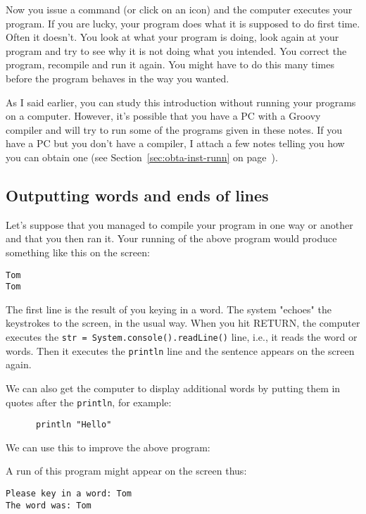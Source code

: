 Now you issue a command (or click on an icon) and the computer executes
your program.  If you are lucky, your program does what it is supposed
to do first time.  Often it doesn't.  You look at what your program is
doing, look again at your program and try to see why it is not doing what
you intended.  You correct the program, recompile and run it again.
You might have to do this many times before the program behaves in the way
you wanted.

As I said earlier, you can study this introduction without running your
programs on a computer.  However, it's possible that you have a PC with
a Groovy compiler and will try to run some of the programs given in these
notes. 
If you have a PC but you don't have a compiler, I attach a few notes telling
you how you can obtain one (see Section~\ref{sec:obta-inst-runn} on
page~\pageref{sec:obta-inst-runn}).

\subsection{Outputting words and ends of lines}

Let's suppose that you managed to compile your program in one way or
another and that you then ran it.  Your running of the above program
would produce something like this on the screen:

\begin{Verbatim}
Tom
Tom
\end{Verbatim}

The first line is the result of you keying in a word.  The system "echoes"
the keystrokes to the screen, in the usual way.  When you hit RETURN, the
computer executes the \verb!str = System.console().readLine()! line, 
i.e., it reads the word or words.  Then it
executes the \verb!println! line and the sentence appears on the screen again.

We can also get the computer to display additional words by putting
them in quotes after the \verb!println!, for example:

\begin{Verbatim}
      println "Hello"
\end{Verbatim}

We can use this to improve the above program:


A run of this program might appear on the screen thus:
\begin{Verbatim}
Please key in a word: Tom
The word was: Tom
\end{Verbatim}

